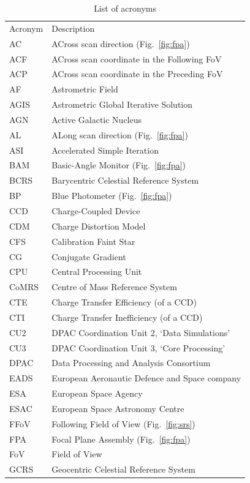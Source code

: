 \documentclass[structabstract]{aa}
\begin{document}
\begin{table}
\caption{\label{tab:acr} List of acronyms}
\centering
\begin{tabular}{ll}
\hline\hline
\noalign{\smallskip} 
Acronym & Description \\
\noalign{\smallskip} 
\hline 
\noalign{\smallskip} 
AC&ACross scan direction (Fig.~\ref{fig:fpa}) \\
ACF&ACross scan coordinate in the Following FoV \\
ACP&ACross scan coordinate in the Preceding FoV \\
AF&Astrometric Field \\
AGIS&Astrometric Global Iterative Solution \\
AGN&Active Galactic Nucleus \\
AL&ALong scan direction (Fig.~\ref{fig:fpa}) \\
ASI&Accelerated Simple Iteration \\
BAM&Basic-Angle Monitor (Fig.~\ref{fig:fpa}) \\
BCRS&Barycentric Celestial Reference System \\
BP&Blue Photometer (Fig.~\ref{fig:fpa}) \\
CCD&Charge-Coupled Device \\
CDM&Charge Distortion Model \\
CFS&Calibration Faint Star \\
CG&Conjugate Gradient \\
CPU&Central Processing Unit \\
CoMRS&Centre of Mass Reference System \\
CTE & Charge Transfer Efficiency (of a CCD) \\
CTI & Charge Transfer Inefficiency (of a CCD) \\
CU2 & DPAC Coordination Unit 2, `Data Simulations' \\
CU3 & DPAC Coordination Unit 3, `Core Processing' \\
DPAC&Data Processing and Analysis Consortium \\
EADS&European Aeronautic Defence and Space company  \\
ESA&European Space Agency \\
ESAC&European Space Astronomy Centre \\
FFoV&Following Field of View (Fig.~\ref{fig:srs}) \\
FPA&Focal Plane Assembly  (Fig.~\ref{fig:fpa})\\
FoV&Field of View \\
GCRS&Geocentric Celestial Reference System \\

\end{tabular}
\end{table}
\end{document}
